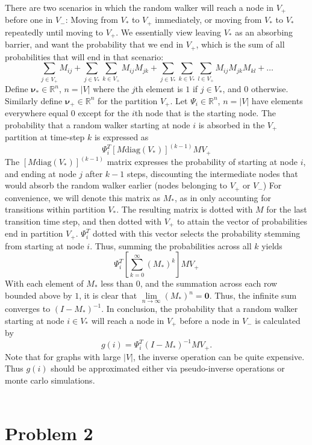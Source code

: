 \documentclass{amsart}
\begin{document}
	There are two scenarios in which the random walker will reach a node in $V_+$ before one in $V_-$: Moving from $V_*$ to $V_+$ immediately, or moving from $V_*$ to $V_*$ repeatedly until moving to $V_+$. We essentially view leaving $V_*$ as an absorbing barrier, and want the probability that we end in $V_+$, which is the sum of all probabilities that will end in that scenario:
	\[
	\sum_{j \in V_+}M_{ij} + \sum_{j \in V_*}\sum_{k \in V_+}M_{ij}M_{jk} + \sum_{j \in V_*}\sum_{k \in V_*}\sum_{l \in V_+}M_{ij}M_{jk}M_{kl} + \dots
	\]
	Define $\mathbf{\nu_*} \in \mathbb{R}^n$, $n=|V|$ where the $j$th element is $1$ if $j \in V_*$, and $0$ otherwise. Similarly define $\mathbf{\nu_+} \in \mathbb{R}^n$ for the partition $V_+$. Let $\Psi_i \in \mathbb{R}^n$, $n=|V|$ have elements everywhere equal 0 except for the $i$th node that is the starting node. The probability that a random walker starting at node $i$ is absorbed in the $V_+$ partition at time-step $k$ is expressed as
	\[
	\Psi_i^T \left[ M\text{diag}\left(V_*\right) \right]^{(k-1)} MV_+
	\]
	The $\left[ M\text{diag}\left(V_*\right) \right]^{(k-1)}$ matrix expresses the probability of starting at node $i$, and ending at node $j$ after $k-1$ steps, discounting the intermediate nodes that would absorb the random walker earlier (nodes belonging to $V_+$ or $V_-$) For convenience, we will denote this matrix as $M_*$, as in only accounting for transitions within partition $V_*$. The resulting matrix is dotted with $M$ for the last transition time step, and then dotted with $V_+$ to attain the vector of probabilities end in partition $V_+$. $\Psi_i^T$ dotted with this vector selects the probability stemming from starting at node $i$. Thus, summing the probabilities across all $k$ yields
	\[
	\Psi_i^T \left[\sum_{k=0}^{\infty}\left( M_* \right)^k\right]MV_+
	\]
	With each element of $M_*$ less than $0$, and the summation across each row bounded above by $1$, it is clear that $\lim\limits_{n \rightarrow \infty} (M_*)^n = \mathbf{0}$. Thus, the infinite sum converges to $(I-M_*)^{-1}$. In conclusion, the probability that a random walker starting at node $i \in V_*$ will reach a node in $V_+$ before a node in $V_-$ is calculated by
	\[
	g(i) = \Psi_i^T\left( I - M_* \right)^{-1}MV_+.
	\]
	Note that for graphs with large $|V|$, the inverse operation can be quite expensive. Thus $g(i)$ should be approximated either via pseudo-inverse operations or monte carlo simulations.
	\\\\
	\section{Problem 2}
	
	
\end{document}
